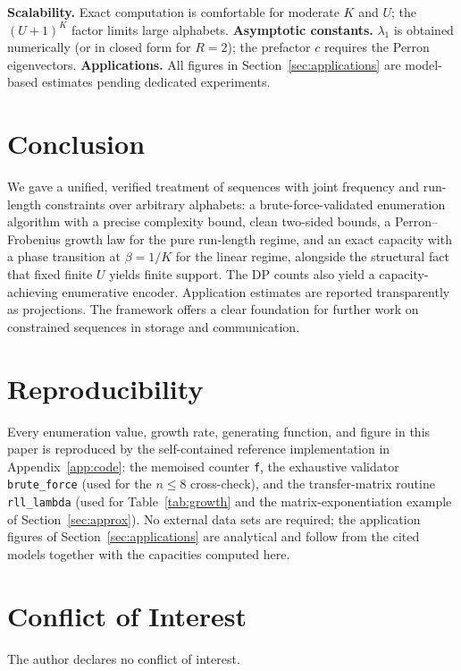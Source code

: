 \documentclass[a4paper,12pt]{article}
\begin{document}
\textbf{Scalability.} Exact computation is comfortable for moderate
$K$ and $U$; the $(U+1)^K$ factor limits large alphabets.
\textbf{Asymptotic constants.} $\lambda_1$ is obtained numerically (or
in closed form for $R=2$); the prefactor $c$ requires the Perron
eigenvectors.
\textbf{Applications.} All figures in
Section~\ref{sec:applications} are model-based estimates pending
dedicated experiments.

\section{Conclusion}

We gave a unified, verified treatment of sequences with joint
frequency and run-length constraints over arbitrary alphabets: a
brute-force-validated enumeration algorithm with a precise complexity
bound, clean two-sided bounds, a Perron--Frobenius growth law for the
pure run-length regime, and an exact capacity with a phase transition
at $\beta=1/K$ for the linear regime, alongside the structural fact
that fixed finite $U$ yields finite support.  The DP counts also yield
a capacity-achieving enumerative encoder.  Application estimates are
reported transparently as projections.  The framework offers a clear
foundation for further work on constrained sequences in storage and
communication.

\section{Reproducibility}

Every enumeration value, growth rate, generating function, and figure
in this paper is reproduced by the self-contained reference
implementation in Appendix~\ref{app:code}: the memoised counter
\texttt{f}, the exhaustive validator \texttt{brute\_force} (used for
the $n\le8$ cross-check), and the transfer-matrix routine
\texttt{rll\_lambda} (used for Table~\ref{tab:growth} and the
matrix-exponentiation example of Section~\ref{sec:approx}). No external
data sets are required; the application figures of
Section~\ref{sec:applications} are analytical and follow from the cited
models together with the capacities computed here.

\section*{Conflict of Interest}
The author declares no conflict of interest.
\end{document}
